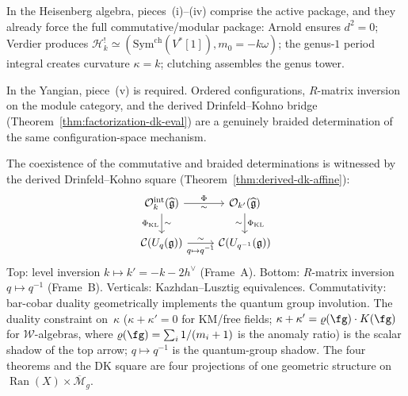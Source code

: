\begin{remark}
\smallskip\noindent
In the Heisenberg algebra, pieces~(i)--(iv) comprise the active
package, and they
already force the full commutative/modular package: Arnold ensures
$d^2 = 0$; Verdier produces
$\mathcal{H}_k^!\simeq
(\mathrm{Sym}^{\mathrm{ch}}(V^*[1]),m_0=-k\omega)$; the genus-$1$
period integral creates curvature $\kappa = k$; clutching assembles
the genus tower.

\smallskip\noindent
In the Yangian, piece~(v) is required. Ordered
configurations, $R$-matrix inversion on the module category, and the
derived Drinfeld--Kohno bridge
(Theorem~\ref{thm:factorization-dk-eval}) are a genuinely braided determination of
the same configuration-space mechanism.
\end{remark}

\begin{remark}\label{rem:dk-inevitability}
The coexistence of the commutative and braided determinations is
witnessed by the derived
Drinfeld--Kohno square (Theorem~\ref{thm:derived-dk-affine}):
\begin{equation}\label{eq:dk-intro}
\begin{tikzcd}
\mathcal{O}_k^{\mathrm{int}}(\widehat{\mathfrak{g}})
 \ar[r, "\Phi", "\sim"']
 \ar[d, "\Phi_{\mathrm{KL}}"', "\sim"]
& \mathcal{O}_{k'}(\widehat{\mathfrak{g}})
 \ar[d, "\Phi_{\mathrm{KL}}", "\sim"']
\\
\mathcal{C}(U_q(\mathfrak{g}))
 \ar[r, "q \mapsto q^{-1}"', "\sim"]
& \mathcal{C}(U_{q^{-1}}(\mathfrak{g}))
\end{tikzcd}
\end{equation}
Top: level inversion $k \mapsto k' = -k - 2h^\vee$ (Frame~A).
Bottom: $R$-matrix inversion $q \mapsto q^{-1}$ (Frame~B).
Verticals: Kazhdan--Lusztig equivalences. Commutativity: bar-cobar
duality geometrically implements the quantum group involution.
The duality constraint on~$\kappa$
($\kappa + \kappa' = 0$ for KM/free fields;
$\kappa + \kappa' = \varrho(\fg)\cdot K(\fg)$ for $\mathcal{W}$-algebras,
where $\varrho(\fg) = \sum_i 1/(m_i+1)$ is the anomaly ratio)
is the scalar shadow of the top arrow;
$q \mapsto q^{-1}$ is the quantum-group shadow.
The four theorems and the DK square are four projections of one
geometric structure on
$\operatorname{Ran}(X) \times \overline{\mathcal{M}}_g$.
\end{remark}

